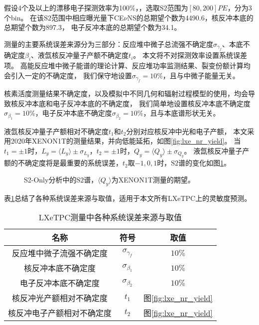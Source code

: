 假设4个及以上的漂移电子探测效率为100\%，，选取$\mathrm{S2}$范围为$[80, 200]\si{PE}$，分为3个bin。
在该$\mathrm{S2}$范围中相应曝光量下CE$\nu$NS的总期望个数为4490.6，核反冲本底的总期望个数为897.3，
电子反冲本底的总期望个数为34.1。

测量的主要系统误差来源分为三部分：反应堆中微子总流强不确定度$\sigma_{\gamma_f}$、本底不确定度$\beta_i$、液氙核反冲量子产额不确定度$t_i$。
本文将不对探测效率设置系统误差项。
高能反应堆中微子能谱的理论计算、反应堆功率监测结果、裂变份额计算均会引入一定的不确定度\cite{an_improved_2017}，
我们保守地设置$\sigma_{\gamma_f}=10\%$，且与中微子能量无关。

核素活度测量结果不确定度，以及模拟中不同几何和辐射过程模型的使用，均会导致核反冲本底和电子反冲本底的不确定度，
我们简单地设置核反冲本底不确定度$\sigma_{\beta_1}=10\%$，电子反冲本底不确定度$\sigma_{\beta_2}=10\%$，且与本底谱形状无关。

液氙核反冲量子产额相对不确定度$t_1$和$t_2$分别对应核反冲中光和电子产额，
本文采用2020年XENON1T的测量结果\cite{aprile_search_2021}，并向低能延拓，如图\ref{fig:lxe_nr_yield}。
当$t_1=\pm1$时，$L_y=\langle L_y\rangle\pm\sigma_{L_y}$，$t_2=\pm1$时，$Q_y=\langle Q_y\rangle\pm\sigma_{Q_y}$。
液氙核反冲量子产额的不确定度将是最重要的系统误差，$t_2$取$-1,0,1$时，$\mathrm{S2}$谱的变化如图\ref{fig:xe_rate_prediction_t2}。

\begin{figure}
  \centering
  
  \caption{\label{fig:xe_rate_prediction_t2} S2-Only分析中的$\mathrm{S2}$谱，$\langle Q_y\rangle$为XENON1T测量的期望。}
\end{figure}

表\ref{tab:sys_error}总结了各种系统误差来源与取值，适用于本文所有LXeTPC上的灵敏度预测。

\begin{table}
  \centering
  \caption{LXeTPC测量中各种系统误差来源与取值}
  \begin{tabular}{ccc}
    \toprule
    名称 & 符号 & 取值 \\
    \midrule
    反应堆中微子流强不确定度 & $\sigma_{\gamma_f}$ & $10\%$ \\
    核反冲本底不确定度 & $\sigma_{\beta_1}$ & $10\%$ \\
    电子反冲本底不确定度 & $\sigma_{\beta_2}$ & $10\%$ \\
    核反冲光产额相对不确定度 & $t_1$ & 图\ref{fig:lxe_nr_yield} \\
    核反冲电子产额相对不确定度 & $t_2$ & 图\ref{fig:lxe_nr_yield} \\
    \bottomrule
  \end{tabular}
  \label{tab:sys_error}
\end{table}

